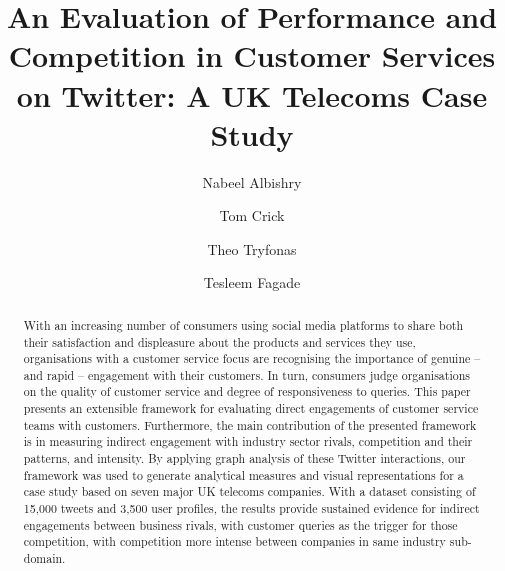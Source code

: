 \documentclass[sigconf]{acmart}
\begin{document}
\title[An Evaluation of Performance and Competition in Customer Services on
  Twitter]{An Evaluation of Performance and Competition in Customer Services on
  Twitter: A UK Telecoms Case Study}

\author{Nabeel Albishry}

\author{Tom Crick}

\author{Theo Tryfonas}


\author{Tesleem Fagade}



 
\renewcommand{\shortauthors}{Albishry, Crick, Tryfonas, and Fagade}


\begin{abstract}
With an increasing number of consumers using social media platforms to
share both their satisfaction and displeasure about the products and
services they use, organisations with a customer service focus are
recognising the importance of genuine -- and rapid -- engagement with
their customers. In turn, consumers judge organisations on the quality
of customer service and degree of responsiveness to queries. This
paper presents an extensible framework for evaluating direct
engagements of customer service teams with customers. Furthermore, 
the main contribution of the presented framework is in measuring indirect 
engagement with industry sector rivals, competition
and their patterns, and intensity. By applying graph analysis of these
Twitter interactions, our framework was used to generate analytical
measures and visual representations for a case study based on seven
major UK telecoms companies. With a dataset consisting of 15,000
tweets and 3,500 user profiles, the results provide sustained evidence
for indirect engagements between business rivals, with customer
queries as the trigger for those competition, with competition more
intense between companies in same industry sub-domain.
\end{abstract}
\end{document}
